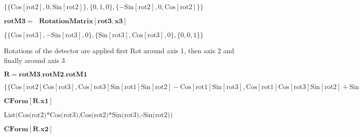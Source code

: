 \documentclass{article}
\begin{document}
\begin{doublespace}
\noindent\(\{\{\text{Cos}[\text{rot2}],0,\text{Sin}[\text{rot2}]\},\{0,1,0\},\{-\text{Sin}[\text{rot2}],0,\text{Cos}[\text{rot2}]\}\}\)
\end{doublespace}

\begin{doublespace}
\noindent\(\pmb{\text{rotM3} =\text{  }\text{RotationMatrix}[\text{rot3},\text{x3}]}\)
\end{doublespace}

\begin{doublespace}
\noindent\(\{\{\text{Cos}[\text{rot3}],-\text{Sin}[\text{rot3}],0\},\{\text{Sin}[\text{rot3}],\text{Cos}[\text{rot3}],0\},\{0,0,1\}\}\)
\end{doublespace}

Rotations of the detector are applied first Rot around axis 1, then axis 2 and finally around axis 3

\begin{doublespace}
\noindent\(\pmb{R=\text{rotM3}.\text{rotM2}.\text{rotM1}}\)
\end{doublespace}

\begin{doublespace}
\noindent\(\{\{\text{Cos}[\text{rot2}] \text{Cos}[\text{rot3}],\text{Cos}[\text{rot3}] \text{Sin}[\text{rot1}] \text{Sin}[\text{rot2}]-\text{Cos}[\text{rot1}]
\text{Sin}[\text{rot3}],\text{Cos}[\text{rot1}] \text{Cos}[\text{rot3}] \text{Sin}[\text{rot2}]+\text{Sin}[\text{rot1}] \text{Sin}[\text{rot3}]\},\{\text{Cos}[\text{rot2}]
\text{Sin}[\text{rot3}],\text{Cos}[\text{rot1}] \text{Cos}[\text{rot3}]+\text{Sin}[\text{rot1}] \text{Sin}[\text{rot2}] \text{Sin}[\text{rot3}],-\text{Cos}[\text{rot3}]
\text{Sin}[\text{rot1}]+\text{Cos}[\text{rot1}] \text{Sin}[\text{rot2}] \text{Sin}[\text{rot3}]\},\{-\text{Sin}[\text{rot2}],\text{Cos}[\text{rot2}]
\text{Sin}[\text{rot1}],\text{Cos}[\text{rot1}] \text{Cos}[\text{rot2}]\}\}\)
\end{doublespace}

\begin{doublespace}
\noindent\(\pmb{\text{CForm}[R.\text{x1}]}\)
\end{doublespace}

\begin{doublespace}
\noindent\(\text{List(Cos(rot2)*Cos(rot3),Cos(rot2)*Sin(rot3),-Sin(rot2))}\)
\end{doublespace}

\begin{doublespace}
\noindent\(\pmb{\text{CForm}[R.\text{x2}]}\)
\end{doublespace}
\end{document}

